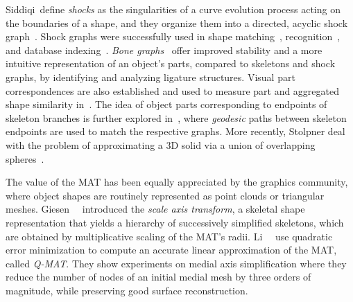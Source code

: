 \documentclass[10pt,twocolumn,letterpaper]{article}
\begin{document}
Siddiqi~\etal define \emph{shocks} as the singularities of a curve evolution process acting on the boundaries of
a shape, and they organize them into a directed, acyclic shock graph~\cite{siddiqi1999shock}.
Shock graphs were successfully used in shape matching~\cite{siddiqi1999shock}, recognition~\cite{sebastian2001recognition},
and database indexing~\cite{sebastian2002shock}.
\emph{Bone graphs}~\cite{macrini2008skeletons} offer improved stability and a more intuitive representation of an object's parts, 
compared to skeletons and shock graphs, by identifying and analyzing ligature structures.
Visual part correspondences are also established and used to measure part and aggregated shape similarity in~\cite{latecki2000shape}.
The idea of object parts corresponding to endpoints of skeleton branches is further explored in~\cite{bai2008path}, where
\emph{geodesic} paths between skeleton endpoints are used to match the respective graphs.
More recently, Stolpner \etal deal with the problem of approximating a 3D solid via a union
of overlapping spheres~\cite{stolpner2012medial}.

The value of the MAT has been equally appreciated by the graphics community, where object shapes 
are routinely represented as point clouds or triangular meshes.
Giesen~\etal~\cite{giesen2009scale} introduced the \emph{scale axis transform}, a skeletal shape representation
that yields a hierarchy of successively simplified skeletons, which are obtained by multiplicative scaling of the
MAT's radii.
Li~\etal~\cite{li2015q} use quadratic error minimization to compute an accurate linear approximation of the MAT, called \emph{Q-MAT}.
They show experiments on medial axis simplification where they reduce the number of nodes of an initial medial mesh
by three orders of magnitude, while preserving good surface reconstruction.
\end{document}
